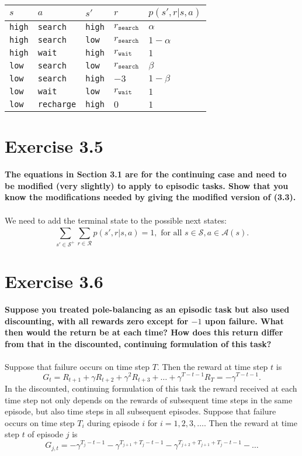 \documentclass[a4paper,11pt]{article}
\numberwithin{equation}{section}
\theoremstyle{remark}
\begin{document}
\begin{table}[h]
	\centering
	\small{
		\begin{tabular}{| l | l | l | l | l |}
			\hline
			$s$ & $a$ & $s'$ & $r$ & $p(s', r | s, a)$ \\
			\hline
			\texttt{high} & \texttt{search} & \texttt{high} & $r_{\texttt{search}}$ & $\alpha$ \\
			\texttt{high} & \texttt{search} & \texttt{low} & $r_{\texttt{search}}$ & $1 - \alpha$ \\
			\texttt{high} & \texttt{wait} & \texttt{high} & $r_{\texttt{wait}}$ & $1$ \\
			\texttt{low} & \texttt{search} & \texttt{low} & $r_{\texttt{search}}$ & $\beta$ \\
			\texttt{low} & \texttt{search} & \texttt{high} & $-3$ & $1 - \beta$ \\
			\texttt{low} & \texttt{wait} & \texttt{low} & $r_{\texttt{wait}}$ & $1$ \\
			\texttt{low} & \texttt{recharge} & \texttt{high} & $0$ & $1$ \\
			\hline
		\end{tabular}
	}
\end{table}


\section{Exercise 3.5}

\textbf{The equations in Section 3.1 are for the continuing case and need to be modified (very slightly) to apply to episodic tasks. Show that you know the modifications needed by giving the modified version of (3.3).}
\\ \\
We need to add the terminal state to the possible next states:
\[
	\sum_{s' \in \mathcal{S}^+}^{} \sum_{r \in \mathcal{R}}^{} p(s', r | s, a) = 1, \text{ for all } s \in \mathcal{S}, a \in \mathcal{A}(s).
\]

\section{Exercise 3.6}

\textbf{Suppose you treated pole-balancing as an episodic task but also used discounting, with all rewards zero except for $-1$ upon failure. What then would the return be at each time? How does this return differ from that in the discounted, continuing formulation of this task?}
\\ \\
Suppose that failure occurs on time step $T$. Then the reward at time step $t$ is
\[
	G_t = R_{t+1} + \gamma R_{t+2} + \gamma^2 R_{t+3} + \dots + \gamma^{T - t - 1} R_{T} = -\gamma^{T - t - 1}.
\]
In the discounted, continuing formulation of this task the reward received at each time step not only depends on the rewards of subsequent time steps in the same episode, but also time steps in all subsequent episodes. Suppose that failure occurs on time step $T_i$ during episode $i$ for $i=1, 2, 3, \dots$. Then the reward at time step $t$ of episode $j$ is
\[
	G_{j, t} = -\gamma^{T_j - t - 1}  - \gamma^{T_{j+1} + T_j - t - 1} - \gamma^{T_{j+2} + T_{j+1} + T_j - t - 1} - \dots
\]
\end{document}
